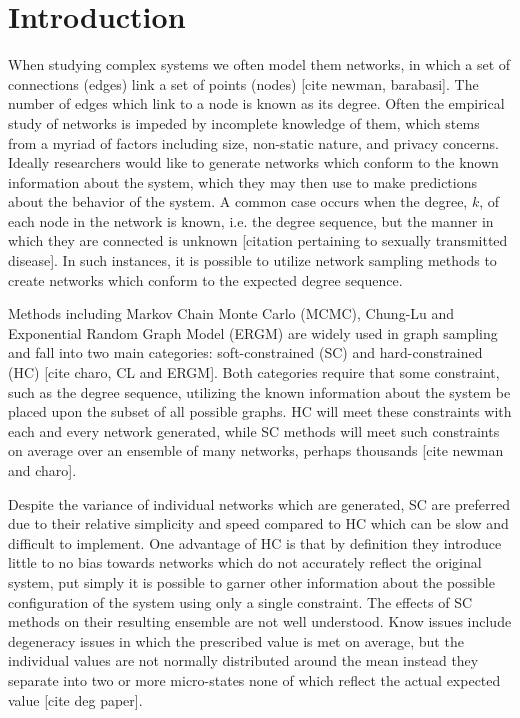\documentclass[aip,graphicx,amsmath]{revtex4-1}
\begin{document}
\section{Introduction}
	When studying complex systems we often model them networks, in which a set of connections (edges) link a set of points (nodes) [cite newman, barabasi]. The number of edges which link to a node is known as its degree. Often the empirical study of networks is impeded by incomplete knowledge of them, which stems from a myriad of factors including size, non-static nature, and privacy concerns. Ideally researchers would like to generate networks which conform to the known information about the system, which they may then use to make predictions about the behavior of the system. A common case occurs when the degree, $k$, of each node in the network is known, i.e. the degree sequence, but the manner in which they are connected is unknown [citation pertaining to sexually transmitted disease]. In such instances, it is possible to utilize network sampling methods to create networks which conform to the expected degree sequence.
	
	Methods including Markov Chain Monte Carlo (MCMC), Chung-Lu and Exponential Random Graph Model (ERGM) are widely used in graph sampling and fall into two main categories: soft-constrained (SC) and hard-constrained (HC) [cite charo, CL and ERGM]. Both categories require that some constraint, such as the degree sequence, utilizing the known information about the system be placed upon the subset of all possible graphs. HC will meet these constraints with each and every network generated, while SC methods will meet such constraints on average over an ensemble of many networks, perhaps thousands [cite newman and charo].
	
	Despite the variance of individual networks which are generated, SC are preferred due to their relative simplicity and speed compared to HC which can be slow and difficult to implement. One advantage of HC is that by definition they introduce little to no bias towards networks which do not accurately reflect the original system, put simply it is possible to garner other information about the possible configuration of the system using only a single constraint. The effects of SC methods on their resulting ensemble are not well understood. Know issues include degeneracy issues in which the prescribed value is met on average, but the individual values are not normally distributed around the mean instead they separate into two or more micro-states none of which reflect the actual expected value [cite deg paper].
	
\end{document}
